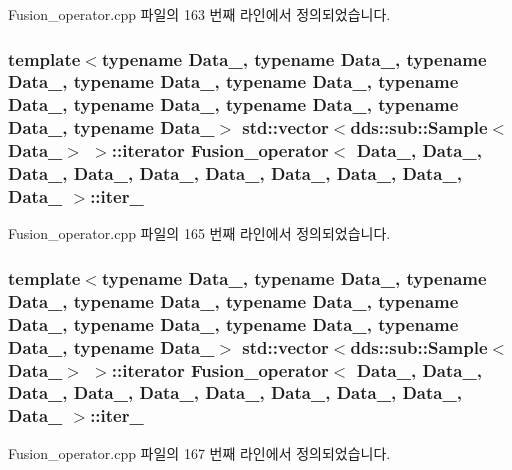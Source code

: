 Fusion\+\_\+operator.\+cpp 파일의 163 번째 라인에서 정의되었습니다.

\subsubsection[{\texorpdfstring{iter\+\_\+2}{iter_2}}]{\setlength{\rightskip}{0pt plus 5cm}template$<$typename Data\+\_, typename Data\+\_, typename Data\+\_, typename Data\+\_, typename Data\+\_, typename Data\+\_, typename Data\+\_, typename Data\+\_, typename Data\+\_, typename Data\+\_$>$ std\+::vector$<$dds\+::sub\+::\+Sample$<$Data\+\_$>$ $>$\+::iterator {\bf Fusion\+\_\+operator}$<$ Data\+\_, Data\+\_, Data\+\_, Data\+\_, Data\+\_, Data\+\_, Data\+\_, Data\+\_, Data\+\_, Data\+\_ $>$\+::iter\+\_}\hypertarget{classFusion__operator_a4fd31cb3bea3e7362643729b4bdcb3f1}{}\label{classFusion__operator_a4fd31cb3bea3e7362643729b4bdcb3f1}


Fusion\+\_\+operator.\+cpp 파일의 165 번째 라인에서 정의되었습니다.

\subsubsection[{\texorpdfstring{iter\+\_\+3}{iter_3}}]{\setlength{\rightskip}{0pt plus 5cm}template$<$typename Data\+\_, typename Data\+\_, typename Data\+\_, typename Data\+\_, typename Data\+\_, typename Data\+\_, typename Data\+\_, typename Data\+\_, typename Data\+\_, typename Data\+\_$>$ std\+::vector$<$dds\+::sub\+::\+Sample$<$Data\+\_$>$ $>$\+::iterator {\bf Fusion\+\_\+operator}$<$ Data\+\_, Data\+\_, Data\+\_, Data\+\_, Data\+\_, Data\+\_, Data\+\_, Data\+\_, Data\+\_, Data\+\_ $>$\+::iter\+\_}\hypertarget{classFusion__operator_a15048a8432350604c31fbbd6945d4692}{}\label{classFusion__operator_a15048a8432350604c31fbbd6945d4692}


Fusion\+\_\+operator.\+cpp 파일의 167 번째 라인에서 정의되었습니다.

